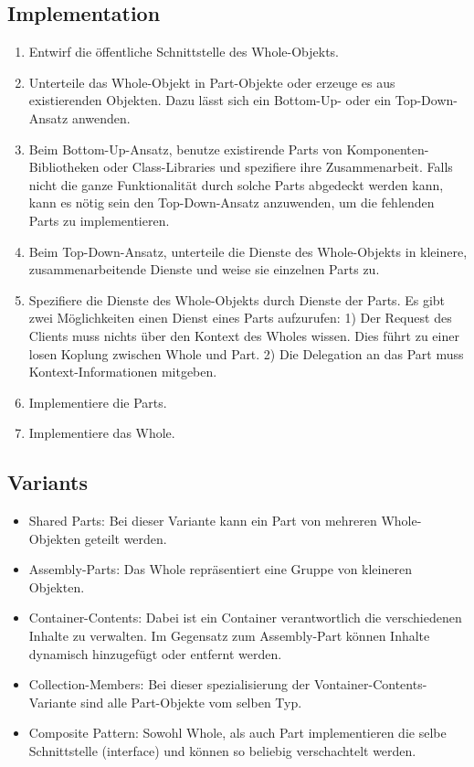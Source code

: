 \subsection*{Implementation}


\begin{enumerate}
	\item Entwirf die öffentliche Schnittstelle des Whole-Objekts.
	\item Unterteile das Whole-Objekt in Part-Objekte oder erzeuge es aus existierenden Objekten. Dazu lässt sich ein Bottom-Up- oder ein Top-Down-Ansatz anwenden.
	\item Beim Bottom-Up-Ansatz, benutze existirende Parts von Komponenten-Bibliotheken oder Class-Libraries und spezifiere ihre Zusammenarbeit. Falls nicht die ganze Funktionalität durch solche Parts abgedeckt werden kann, kann es nötig sein den Top-Down-Ansatz anzuwenden, um die fehlenden Parts zu implementieren.
	\item Beim Top-Down-Ansatz, unterteile die Dienste des Whole-Objekts in kleinere, zusammenarbeitende Dienste und weise sie einzelnen Parts zu.
	\item Spezifiere die Dienste des Whole-Objekts durch Dienste der Parts. Es gibt zwei Möglichkeiten einen Dienst eines Parts aufzurufen: 1) Der Request des Clients muss nichts über den Kontext des Wholes wissen. Dies führt zu einer losen Koplung zwischen Whole und Part. 2) Die Delegation an das Part muss Kontext-Informationen mitgeben.
	\item Implementiere die Parts.
	\item Implementiere das Whole.
\end{enumerate}


\subsection*{Variants}

\begin{itemize}
	\item Shared Parts: Bei dieser Variante kann ein Part von mehreren Whole-Objekten geteilt werden.
	\item Assembly-Parts: Das Whole repräsentiert eine Gruppe von kleineren Objekten.
	\item Container-Contents: Dabei ist ein Container verantwortlich die verschiedenen Inhalte zu verwalten. Im Gegensatz zum Assembly-Part können Inhalte dynamisch hinzugefügt oder entfernt werden.
	\item Collection-Members: Bei dieser spezialisierung der Vontainer-Contents-Variante sind alle Part-Objekte vom selben Typ.
	\item Composite Pattern: Sowohl Whole, als auch Part implementieren die selbe Schnittstelle (interface) und können so beliebig verschachtelt werden.
\end{itemize}

